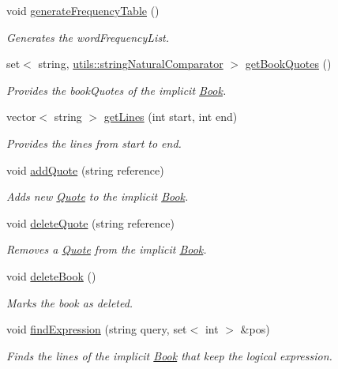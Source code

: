 \begin{DoxyCompactItemize}
void \hyperlink{class_book_a8d232eaeb4207707d77bc18e6dd467cd}{generate\+Frequency\+Table} ()
\begin{DoxyCompactList}\small\item\em Generates the word\+Frequency\+List. \end{DoxyCompactList}\item 
set$<$ string, \hyperlink{structutils_1_1string_natural_comparator}{utils\+::string\+Natural\+Comparator} $>$ \hyperlink{class_book_a85273ee0886a725c370d8efe1909f595}{get\+Book\+Quotes} ()
\begin{DoxyCompactList}\small\item\em Provides the book\+Quotes of the implicit \hyperlink{class_book}{Book}. \end{DoxyCompactList}\item 
vector$<$ string $>$ \hyperlink{class_book_acb5eaff231b512901cac3e3220ee2960}{get\+Lines} (int start, int end)
\begin{DoxyCompactList}\small\item\em Provides the lines from start to end. \end{DoxyCompactList}\item 
void \hyperlink{class_book_a97c2374d514327be5d8f74abd0ff4ea3}{add\+Quote} (string reference)
\begin{DoxyCompactList}\small\item\em Adds new \hyperlink{class_quote}{Quote} to the implicit \hyperlink{class_book}{Book}. \end{DoxyCompactList}\item 
void \hyperlink{class_book_a0829e0eaf0769c2bdbd149d2cf2ce20b}{delete\+Quote} (string reference)
\begin{DoxyCompactList}\small\item\em Removes a \hyperlink{class_quote}{Quote} from the implicit \hyperlink{class_book}{Book}. \end{DoxyCompactList}\item 
void \hyperlink{class_book_a34626be6b35f4ac97ffd3571210a1393}{delete\+Book} ()
\begin{DoxyCompactList}\small\item\em Marks the book as deleted. \end{DoxyCompactList}\item 
void \hyperlink{class_book_acc3fa87ab1c8eb2186a4c2e1e541f368}{find\+Expression} (string query, set$<$ int $>$ \&pos)
\begin{DoxyCompactList}\small\item\em Finds the lines of the implicit \hyperlink{class_book}{Book} that keep the logical expression. \end{DoxyCompactList}\item 

\end{DoxyCompactItemize}
